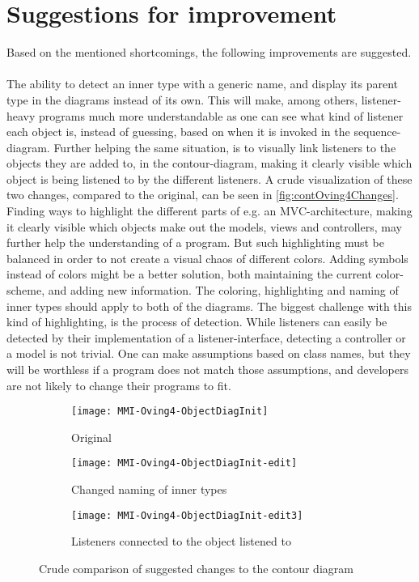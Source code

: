 \section{Suggestions for improvement}\label{jiveSuggestions}

Based on the mentioned shortcomings, the following improvements are suggested.
~\\

The ability to detect an inner type with a generic name, and display its parent type in the diagrams instead of its own.
This will make, among others, listener-heavy programs much more understandable as one can see what kind of listener each object is, instead of guessing, based on when it is invoked in the sequence-diagram.
Further helping the same situation, is to visually link listeners to the objects they are added to, in the contour-diagram, making it clearly visible which object is being listened to by the different listeners.
A crude visualization of these two changes, compared to the original, can be seen in \autoref{fig:contOving4Changes}.
~\\

Finding ways to highlight the different parts of e.g. an MVC-architecture, making it clearly visible which objects make out the models, views and controllers, may further help the understanding of a program.
But such highlighting must be balanced in order to not create a visual chaos of different colors.
Adding symbols instead of colors might be a better solution, both maintaining the current color-scheme, and adding new information.
The coloring, highlighting and naming of inner types should apply to both of the diagrams.
The biggest challenge with this kind of highlighting, is the process of detection.
While listeners can easily be detected by their implementation of a listener-interface, detecting a controller or a model is not trivial.
One can make assumptions based on class names, but they will be worthless if a program does not match those assumptions, and developers are not likely to change their programs to fit.
~\\
\begin{figure}[H]
	\centering
	\begin{subfigure}{\textwidth}
		\centering
		\texttt{[image: MMI-Oving4-ObjectDiagInit]}
		\caption{Original}
		\label{fig:contOving4ChangesA}
	\end{subfigure}
	\begin{subfigure}{\textwidth}
		\centering
		\texttt{[image: MMI-Oving4-ObjectDiagInit-edit]}
		\caption{Changed naming of inner types}
		\label{fig:contOving4ChangesB}
	\end{subfigure}
	\begin{subfigure}{\textwidth}
		\centering
		\texttt{[image: MMI-Oving4-ObjectDiagInit-edit3]}
		\caption{Listeners connected to the object listened to}
		\label{fig:contOving4ChangesC}
	\end{subfigure}
	\caption{Crude comparison of suggested changes to the contour diagram}
	\label{fig:contOving4Changes} 
\end{figure}
~\\

